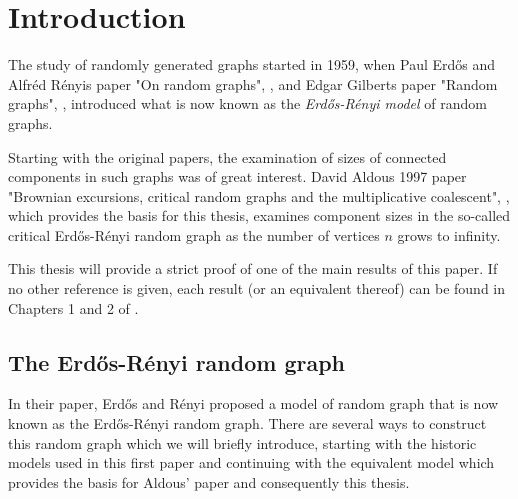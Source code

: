 
\chapter{Introduction}

The study of randomly generated graphs started in 1959,
when Paul Erd\H{o}s and Alfréd Rényis paper "On random graphs", \cite{Erdos.1959},
and Edgar Gilberts paper "Random graphs", \cite{Gilbert.1959},
introduced what is now known as the \emph{Erd\H{o}s-Rényi model} of random graphs.

Starting with the original papers,
the examination of sizes of connected components in such graphs was of great interest.
David Aldous 1997 paper "Brownian excursions, critical random graphs and the multiplicative coalescent", \cite{Aldous.1997},
which provides the basis for this thesis,
examines component sizes in the so-called critical Erd\H{o}s-Rényi random graph as the number of vertices $n$ grows to infinity.

This thesis will provide a strict proof of one of the main results of this paper.
If no other reference is given, each result (or an equivalent thereof) can be found in Chapters 1 and 2 of \cite{Aldous.1997}.


\section{The Erd\H{o}s-Rényi random graph}

In their paper, Erd\H{o}s and Rényi proposed a model of random graph that is now known as the Erd\H{o}s-Rényi random graph.
There are several ways to construct this random graph which we will briefly introduce,
starting with the historic models used in this first paper 
and continuing with the equivalent model which provides the basis for Aldous' paper and consequently this thesis.

